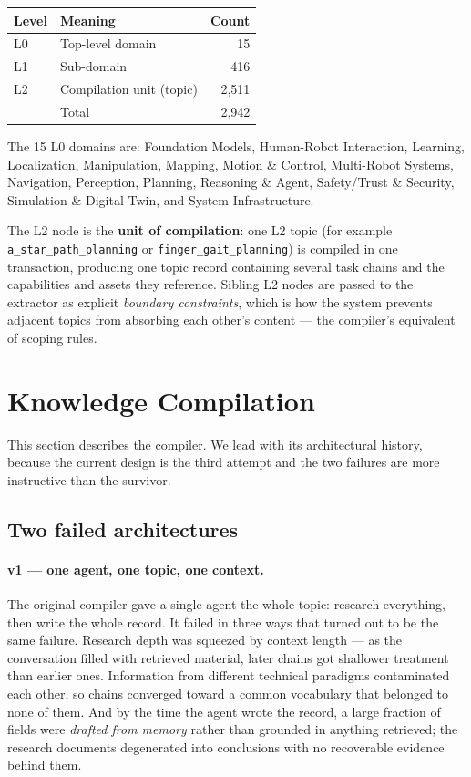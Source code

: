 \documentclass[10pt,a4paper]{article}
\begin{document}
\begin{center}
\small
\begin{tabular}{@{}llr@{}}
\toprule
Level & Meaning & Count \\
\midrule
L0 & Top-level domain & 15 \\
L1 & Sub-domain & 416 \\
L2 & Compilation unit (topic) & 2{,}511 \\
\midrule
& Total & 2{,}942 \\
\bottomrule
\end{tabular}
\end{center}

\noindent The 15 L0 domains are: Foundation Models, Human-Robot Interaction,
Learning, Localization, Manipulation, Mapping, Motion \& Control, Multi-Robot
Systems, Navigation, Perception, Planning, Reasoning \& Agent, Safety/Trust \&
Security, Simulation \& Digital Twin, and System Infrastructure.

The L2 node is the \textbf{unit of compilation}: one L2 topic (for example
\texttt{a\_star\_path\_}\allowbreak\texttt{planning} or
\texttt{finger\_gait\_planning}) is compiled in
one transaction, producing one topic record containing several task chains and
the capabilities and assets they reference. Sibling L2 nodes are passed to the
extractor as explicit \emph{boundary constraints}, which is how the system
prevents adjacent topics from absorbing each other's content --- the compiler's
equivalent of scoping rules.

\section{Knowledge Compilation}
\label{sec:compile}

This section describes the compiler. We lead with its architectural history,
because the current design is the third attempt and the two failures are more
instructive than the survivor.

\subsection{Two failed architectures}
\label{sec:history}

\paragraph{v1 --- one agent, one topic, one context.} The original compiler gave
a single agent the whole topic: research everything, then write the whole record.
It failed in three ways that turned out to be the same failure. Research depth
was squeezed by context length --- as the conversation filled with retrieved
material, later chains got shallower treatment than earlier ones. Information
from different technical paradigms contaminated each other, so chains converged
toward a common vocabulary that belonged to none of them. And by the time the
agent wrote the record, a large fraction of fields were \emph{drafted from
memory} rather than grounded in anything retrieved; the research documents
degenerated into conclusions with no recoverable evidence behind them.
\end{document}
